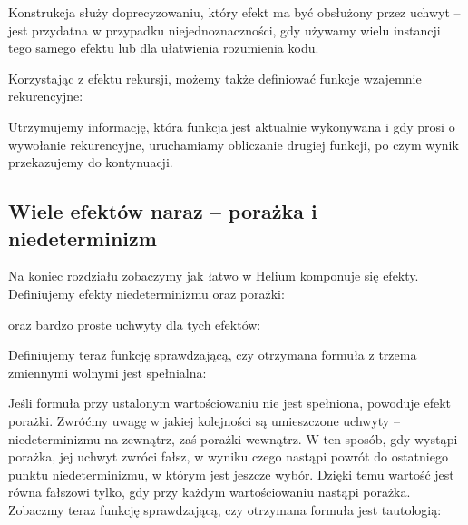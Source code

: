Konstrukcja  służy doprecyzowaniu, który efekt ma być obsłużony przez uchwyt -- jest przydatna w przypadku niejednoznaczności, gdy używamy wielu instancji tego samego efektu lub dla ułatwienia rozumienia kodu.

Korzystając z efektu rekursji, możemy także definiować funkcje wzajemnie rekurencyjne:



Utrzymujemy informację, która funkcja jest aktualnie wykonywana i gdy prosi o wywołanie rekurencyjne, uruchamiamy obliczanie drugiej funkcji, po czym wynik przekazujemy do kontynuacji.

% 
%

\subsection{Wiele efektów naraz -- porażka i niedeterminizm}

Na koniec rozdziału zobaczymy jak łatwo w Helium komponuje się efekty. Definiujemy efekty niedeterminizmu oraz porażki:



oraz bardzo proste uchwyty dla tych efektów:



Definiujemy teraz funkcję sprawdzającą, czy otrzymana formuła z trzema zmiennymi wolnymi jest spełnialna:



Jeśli formuła przy ustalonym wartościowaniu nie jest spełniona, powoduje efekt porażki. Zwróćmy uwagę w jakiej kolejności są umieszczone uchwyty -- niedeterminizmu na zewnątrz, zaś porażki wewnątrz. W ten sposób, gdy wystąpi porażka, jej uchwyt zwróci fałsz, w wyniku czego nastąpi powrót do ostatniego punktu niedeterminizmu, w którym jest jeszcze wybór. Dzięki temu wartość  jest równa fałszowi tylko, gdy przy każdym wartościowaniu nastąpi porażka. Zobaczmy teraz funkcję sprawdzającą, czy otrzymana formuła jest tautologią:



